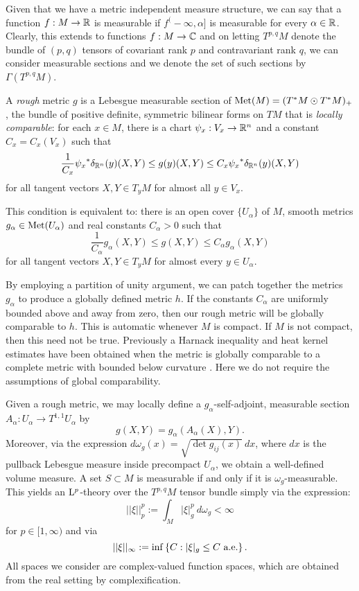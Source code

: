 \documentclass[a4paper, 12pt]{amsart}
\begin{document}
Given that we have a metric independent measure structure, we can say that a function
$f: M \to \mathbb{R}$ is measurable if $f^(-\infty, \alpha]$ is measurable for every $\alpha  \in \mathbb{R}$.
Clearly, this extends to functions $f:M \to \mathbb{C}$ and on letting
 $T^{p,q}M$ denote the bundle of $(p,q)$ tensors of covariant rank $p$ and contravariant rank $q$,
we can consider measurable sections and we denote the set of such 
sections by $\Gamma(T^{p,q}M)$. 

\begin{defn}
A \emph{rough} metric \(g\) is a Lebesgue measurable section of \(\operatorname{Met}(M) = (T^{\ast} M \odot T^{\ast} M)_+\), the bundle of positive definite, symmetric bilinear forms on \(TM\) that is \emph{locally comparable}: 
for each $x \in M$, there is a chart $\psi_x:V_x \to \mathbb{R}^n$ and a constant $C_x = C_x(V_x)$ such that
\[
\frac{1}{C_{x}} {\psi_x}^\ast\delta_{\mathbb{R}^n}(y) (X, Y) \leq g(y)(X, Y) \leq C_{x} {\psi_x}^\ast\delta_{\mathbb{R}^n}(y) (X, Y)
\]
for all tangent vectors \(X, Y \in T_yM\) for almost all $y \in V_x$.
\end{defn}

\begin{rem}
This condition is equivalent to:  there is an open cover \(\lbrace U_{\alpha} \rbrace\) of \(M\), smooth metrics \(g_{\alpha} \in \operatorname{Met}(U_{\alpha})\) and real constants \(C_{\alpha} > 0\) such that
\[
\frac{1}{C_{\alpha}} g_{\alpha} (X, Y) \leq g(X, Y) \leq C_{\alpha} g_{\alpha} (X, Y)
\]
for all tangent vectors \(X, Y \in T_yM\) for almost every $y \in U_\alpha$.
\end{rem}

\begin{rem}
By employing a partition of unity argument, we can patch together the metrics \(g_{\alpha}\) to produce a globally defined metric \(h\). If the constants \(C_{\alpha}\) are uniformly bounded above and away from zero, then our rough metric will be globally comparable to \(h\). This is automatic whenever \(M\) is compact. If \(M\) is not compact, then this need not be true. Previously a Harnack inequality and heat kernel estimates have been obtained when the metric is globally comparable to a complete metric with bounded below curvature \cite{SC}. Here we do not require the assumptions of global comparability.
\end{rem}

Given a rough metric, we may locally define a \(g_{\alpha}\)-self-adjoint, measurable section \(A_{\alpha} : U_{\alpha} \to T^{1,1}U_{\alpha}\) by
\[
g(X, Y) = g_{\alpha} (A_{\alpha} (X), Y).
\]
Moreover, via the expression $d\omega_g(x) = \sqrt{\det g_{ij}(x)}\ dx$, where $dx$ is the pullback
Lebesgue measure inside precompact $U_\alpha$, we obtain a well-defined volume measure. 
A set $S \subset M$ is measurable if and only if it is $\omega_g$-measurable. This yields 
an ${\rm L}^{p}_{\rm {}}$-theory over the $T^{p,q}M$ tensor bundle simply via the expression:
$$||\xi||_p^p := \int_{M} |\xi|_{g}^p\ d\omega_g < \infty$$
for $p \in [1, \infty)$ and via
$$||\xi||_\infty := \inf\left\{C: |\xi|_g \leq C\ \text{a.e.}\right\}.$$
All spaces we consider are complex-valued function spaces, 
which are obtained from the real setting by complexification.
\end{document}
